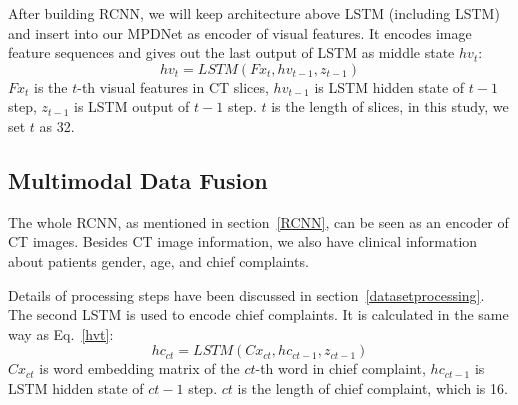\documentclass[journal]{IEEEtran}
\begin{document}
After building RCNN, we will keep architecture above LSTM (including LSTM) and insert into our MPDNet as encoder of visual features. It encodes image feature sequences and gives out the last output of LSTM as middle state $hv_t$:
\begin{equation}
hv_t = LSTM(Fx_t, hv_{t-1}, z_{t-1})
\label{hvt}
\end{equation}
$Fx_t$ is the $t$-th visual features in CT slices, $hv_{t-1}$ is LSTM hidden state of $t-1$ step, $z_{t-1}$ is LSTM output of $t-1$ step. $t$ is the length of slices, in this study, we set $t$ as 32.

\subsection{Multimodal Data Fusion}
\label{MMDDtxt}

The whole RCNN, as mentioned in section~\ref{RCNN}, can be seen as an encoder of CT images.
Besides CT image information, we also have clinical information about patients gender, age, and chief complaints. 

Details of processing steps have been discussed in section~\ref{datasetprocessing}. The second LSTM is used to encode chief complaints. It is calculated in the same way as Eq.~\ref{hvt}:
\begin{equation}
    hc_{ct} = LSTM(Cx_{ct}, hc_{ct-1}, z_{ct-1})
    \label{hct}
\end{equation}
$Cx_{ct}$ is word embedding matrix of the $ct$-th word in chief complaint, $hc_{ct-1}$ is LSTM hidden state of $ct-1$ step. $ct$ is the length of chief complaint, which is 16. 
\end{document}
